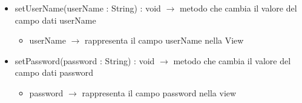\begin{description}
\begin{itemize}
	\item setUserName(userName : String) : void $\rightarrow$ metodo che cambia il valore del campo dati userName\begin{itemize}
		\item userName $\rightarrow$ rappresenta il campo userName nella View
	\end{itemize}
	
	\item setPassword(password : String) : void $\rightarrow$ metodo che cambia il valore del campo dati password\begin{itemize}
		\item password $\rightarrow$ rappresenta il campo password nella view
	\end{itemize}
	
\end{itemize}

\end{description}

